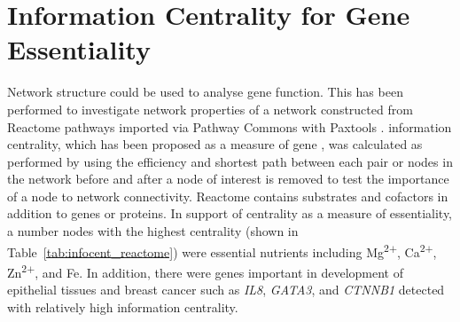 \begin{table*}[!htb]
\caption{\acrshort{ANOVA} for synthetic lethality and PageRank centrality}
\label{tab:mtSL_Pathway_GPCR_PageRank}
\noindent{}
\end{table*}

\FloatBarrier

\iffalse
\chapter{Information Centrality for Gene Essentiality}
\label{appendix:infocent_essential}

\FloatBarrier


Network structure could be used to analyse gene function. This has been performed to investigate network properties of a network constructed from Reactome pathways \citep{Reactome} imported via Pathway Commons with Paxtools \citep{PathwayCommons, paxtools}. \Gls{information centrality}, which has been proposed as a measure of gene , was calculated as performed by \citet{Kranthi2013} using the efficiency and shortest path between each pair or nodes in the network before and after a node of interest is removed to test the importance of a node to network connectivity. Reactome contains substrates and cofactors in addition to genes or proteins. In support of centrality as a measure of essentiality, a number nodes with the highest centrality (shown in Table~\ref{tab:infocent_reactome}) were essential nutrients including Mg\textsuperscript{2$+$}, Ca\textsuperscript{2$+$}, Zn\textsuperscript{2$+$},  and Fe. In addition, there were genes important in development of epithelial tissues and breast cancer such as \textit{IL8}, \textit{GATA3}, and \textit{CTNNB1} detected with relatively high \gls{information centrality}. 

